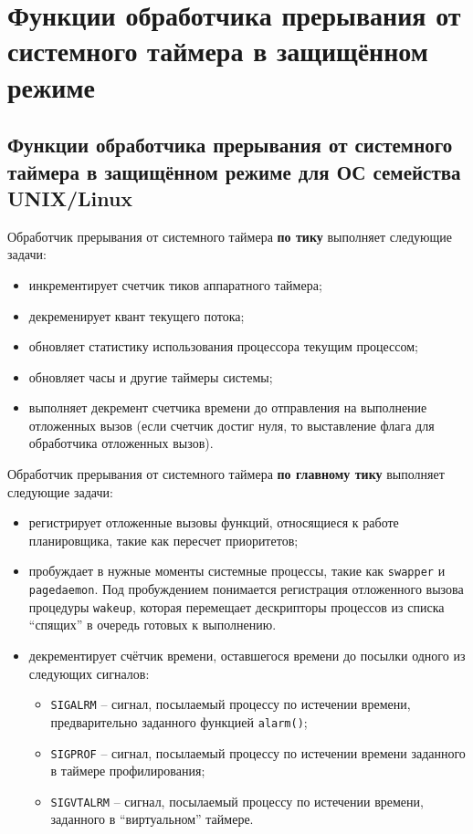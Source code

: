\chapter{Функции обработчика прерывания от системного таймера в защищённом режиме}

\section{Функции обработчика прерывания от системного таймера в защищённом режиме для ОС семейства UNIX/Linux}

Обработчик прерывания от системного таймера \textbf{по тику} выполняет следующие задачи:
\begin{itemize}
    \item инкрементирует счетчик тиков аппаратного таймера;
    \item декременирует квант текущего потока;
    \item обновляет статистику использования процессора текущим процессом;
    \item обновляет часы и другие таймеры системы;
    \item выполняет декремент счетчика времени до отправления на выполнение отложенных вызов (если счетчик достиг нуля, то выставление флага для обработчика отложенных вызов).
\end{itemize}

Обработчик прерывания от системного таймера \textbf{по главному тику} выполняет следующие задачи:
\begin{itemize}
    \item регистрирует отложенные вызовы функций, относящиеся к работе планировщика, такие как пересчет приоритетов;
    \item пробуждает в нужные моменты системные процессы, такие как \texttt{swapper} и \texttt{pagedaemon}.
        Под пробуждением понимается регистрация отложенного вызова процедуры \texttt{wakeup}, которая перемещает дескрипторы процессов из списка ``спящих'' в очередь готовых к выполнению.
    \item декрементирует счётчик времени, оставшегося времени до посылки одного из следующих сигналов:
        \begin{itemize}
            \item \texttt{SIGALRM} – сигнал, посылаемый процессу по истечении времени, предварительно заданного функцией \texttt{alarm()};
            \item \texttt{SIGPROF} –  сигнал, посылаемый процессу по истечении времени заданного в таймере профилирования;
            \item \texttt{SIGVTALRM} –  сигнал, посылаемый процессу по истечении времени, заданного в ``виртуальном'' таймере.
        \end{itemize}
\end{itemize}

